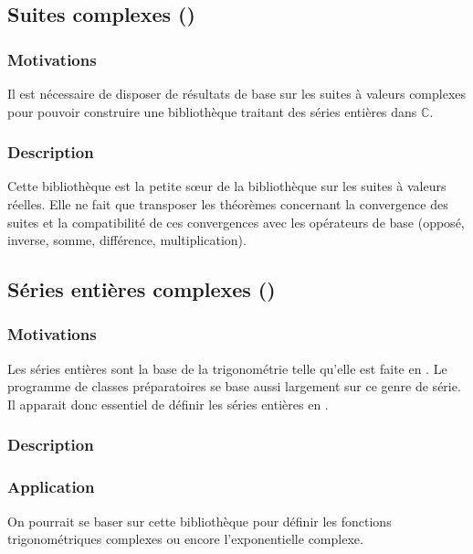 \subsection{Suites complexes ()}

\subsubsection{Motivations}

Il est nécessaire de disposer de résultats de base sur les suites à valeurs complexes pour pouvoir construire une bibliothèque traitant des séries entières dans $\mathbb{C}$.

\subsubsection{Description}

Cette bibliothèque est la petite s\oe{}ur de la bibliothèque sur les suites à valeurs réelles. Elle ne fait que transposer les théorèmes concernant la convergence des suites et la compatibilité de ces convergences avec les opérateurs de base (opposé, inverse, somme, différence, multiplication).

\subsection{Séries entières complexes ()}

\subsubsection{Motivations}

Les séries entières sont la base de la trigonométrie telle qu'elle est faite en \Coq{}. Le programme de classes préparatoires se base aussi largement sur ce genre de série. Il apparait donc essentiel de définir les séries entières en \Coq{}.

\subsubsection{Description}



\subsubsection{Application}

On pourrait se baser sur cette bibliothèque pour définir les fonctions trigonométriques complexes ou encore l'exponentielle complexe.

